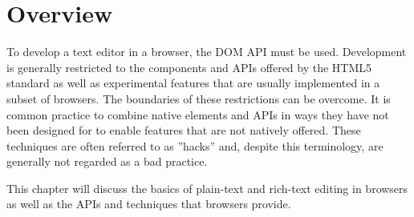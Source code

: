 
\section{Overview}


To develop a text editor in a browser, the DOM API must be used. Development is generally restricted to the components and APIs offered by the HTML5 standard as well as experimental features that are usually implemented in a subset of browsers. The boundaries of these restrictions can be overcome. It is common practice to combine native elements and APIs in ways they have not been designed for to enable features that are not natively offered. These techniques are often referred to as ''hacks'' and, despite this terminology, are generally not regarded as a bad practice.


This chapter will discuss the basics of plain-text and rich-text editing in browsers as well as the APIs and techniques that browsers provide.%




